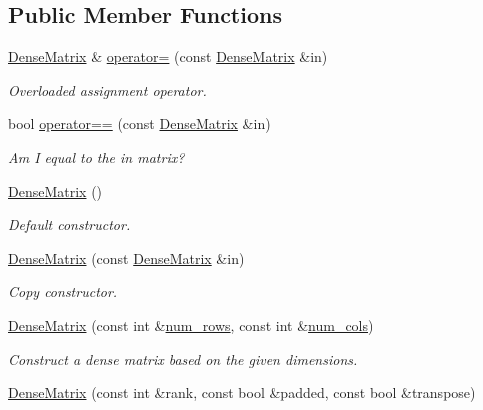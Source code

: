 \subsection*{Public Member Functions}
\begin{DoxyCompactItemize}
\item 
\hyperlink{classmtk_1_1DenseMatrix}{Dense\+Matrix} \& \hyperlink{classmtk_1_1DenseMatrix_a0d27dc7c4d2c49f391017e392345ced0}{operator=} (const \hyperlink{classmtk_1_1DenseMatrix}{Dense\+Matrix} \&in)
\begin{DoxyCompactList}\small\item\em Overloaded assignment operator. \end{DoxyCompactList}\item 
bool \hyperlink{classmtk_1_1DenseMatrix_a94ab5a02d9cf81c17b6f68f4c41cb797}{operator==} (const \hyperlink{classmtk_1_1DenseMatrix}{Dense\+Matrix} \&in)
\begin{DoxyCompactList}\small\item\em Am I equal to the in matrix? \end{DoxyCompactList}\item 
\hyperlink{classmtk_1_1DenseMatrix_a0c75ee704707983f935b02835eab0933}{Dense\+Matrix} ()
\begin{DoxyCompactList}\small\item\em Default constructor. \end{DoxyCompactList}\item 
\hyperlink{classmtk_1_1DenseMatrix_a90102d605a668bf7ecf0d766cc4c10db}{Dense\+Matrix} (const \hyperlink{classmtk_1_1DenseMatrix}{Dense\+Matrix} \&in)
\begin{DoxyCompactList}\small\item\em Copy constructor. \end{DoxyCompactList}\item 
\hyperlink{classmtk_1_1DenseMatrix_abe26c623467fc1b293cf4f22a3a47cc8}{Dense\+Matrix} (const int \&\hyperlink{classmtk_1_1DenseMatrix_a53f3afb3b6a8d21854458aaa9663cc74}{num\+\_\+rows}, const int \&\hyperlink{classmtk_1_1DenseMatrix_a41747502d468c6728a4be31501b16e0e}{num\+\_\+cols})
\begin{DoxyCompactList}\small\item\em Construct a dense matrix based on the given dimensions. \end{DoxyCompactList}\item 
\hyperlink{classmtk_1_1DenseMatrix_a4ef0dec1b5558fcf00719bfac059ec68}{Dense\+Matrix} (const int \&rank, const bool \&padded, const bool \&transpose)

\end{DoxyCompactItemize}
